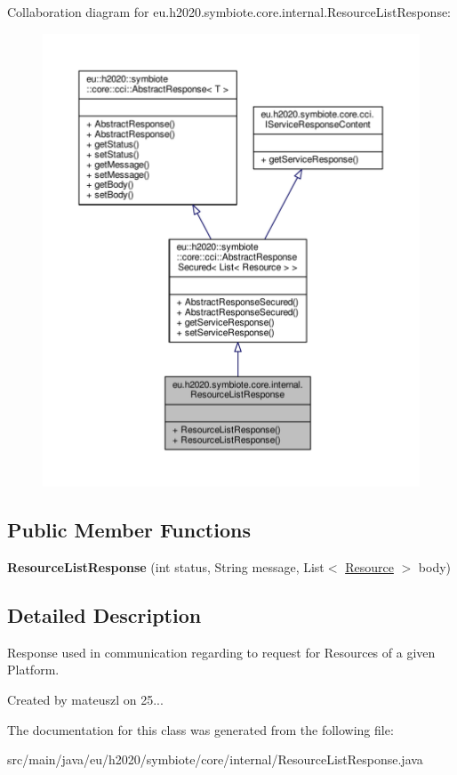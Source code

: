 Collaboration diagram for eu.\+h2020.\+symbiote.\+core.\+internal.\+Resource\+List\+Response\+:
\nopagebreak
\begin{figure}[H]
\begin{center}
\leavevmode
\includegraphics[width=350pt]{classeu_1_1h2020_1_1symbiote_1_1core_1_1internal_1_1ResourceListResponse__coll__graph}
\end{center}
\end{figure}
\subsection*{Public Member Functions}
\begin{DoxyCompactItemize}
\item 
\mbox{\label{classeu_1_1h2020_1_1symbiote_1_1core_1_1internal_1_1ResourceListResponse_a18662a7b8de43bba27211b9d3ed1843e}} 
{\bfseries Resource\+List\+Response} (int status, String message, List$<$ \hyperlink{classeu_1_1h2020_1_1symbiote_1_1model_1_1cim_1_1Resource}{Resource} $>$ body)
\end{DoxyCompactItemize}


\subsection{Detailed Description}
Response used in communication regarding to request for Resources of a given Platform.

Created by mateuszl on 25... 

The documentation for this class was generated from the following file\+:\begin{DoxyCompactItemize}
\item 
src/main/java/eu/h2020/symbiote/core/internal/Resource\+List\+Response.\+java\end{DoxyCompactItemize}
